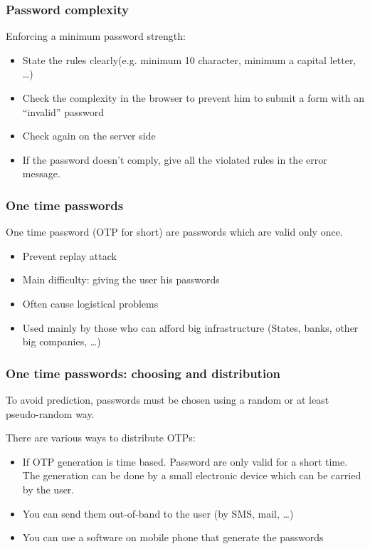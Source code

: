 \begin{frame}
\frametitle{Password complexity}

Enforcing a minimum password strength:
\begin{itemize}
\item State the rules clearly(e.g. minimum 10 character, minimum a
  capital letter, \ldots)
\item Check the complexity in the browser to prevent him to submit a
  form with an ``invalid'' password
\item Check again on the server side
\item If the password doesn't comply, give all the violated rules in
  the error message.
\end{itemize}


\end{frame}



\begin{frame}
\frametitle{One time passwords}

One time password (OTP for short) are passwords which are valid only
once.
\begin{itemize}
\item Prevent replay attack
\item Main difficulty: giving the user his passwords
\item Often cause logistical problems
\item Used mainly by those who can afford big infrastructure (States,
  banks, other big companies, \ldots)
\end{itemize}
\end{frame}


\begin{frame}
\frametitle{One time passwords: choosing and distribution}

To avoid prediction, passwords must be chosen using a random or at
least pseudo-random way.

There are various ways to distribute OTPs:
\begin{itemize}
\item If OTP generation is time based. Password are only valid for a
  short time. The generation can be done by a small electronic
  device which can be carried by the user.
\item You can send them out-of-band to the user (by SMS, mail, \ldots)
\item You can use a software on mobile phone that generate the passwords
\end{itemize}
\end{frame}

